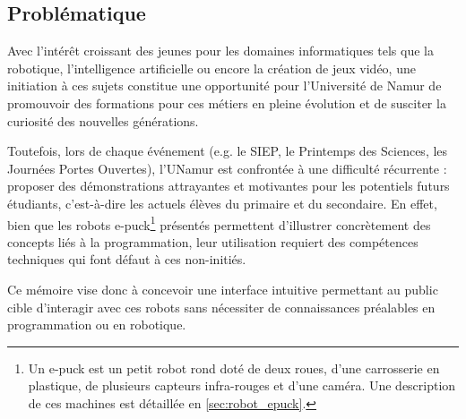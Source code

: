 \subsection{Problématique} \label{sec:problématiques}

Avec l’intérêt croissant des jeunes pour les domaines informatiques tels que la robotique, l’intelligence artificielle ou encore la création de jeux vidéo, une initiation à ces sujets constitue une opportunité pour l’Université de Namur de promouvoir des formations pour ces métiers en pleine évolution et de susciter la curiosité des nouvelles générations.  

Toutefois, lors de chaque événement (e.g. le SIEP, le Printemps des Sciences, les Journées Portes Ouvertes), l’UNamur est confrontée à une difficulté récurrente : proposer des démonstrations attrayantes et motivantes pour les potentiels futurs étudiants, c'est-à-dire les actuels élèves du primaire et du secondaire. 
En effet, bien que les robots e-puck\footnote{Un e-puck est un petit robot rond doté de deux roues, d'une carrosserie en plastique, de plusieurs capteurs infra-rouges et d'une caméra. Une description de ces machines est détaillée en \autoref{sec:robot_epuck}.} présentés permettent d’illustrer concrètement des concepts liés à la programmation, leur utilisation requiert des compétences techniques qui font défaut à ces non-initiés.

Ce mémoire vise donc à concevoir une interface intuitive permettant au public cible d’interagir avec ces robots sans nécessiter de connaissances préalables en programmation ou en robotique.  
